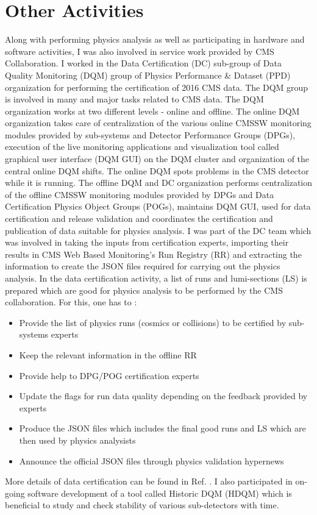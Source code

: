 \section{Other Activities}
Along with performing physics analysis as well as participating in hardware and software activities, I was also involved in service work provided by CMS Collaboration. I worked in the Data Certification (DC) sub-group of Data Quality Monitoring (DQM) group \cite{DQM} of Physics Performance \& Dataset (PPD) organization for performing the certification of 2016 CMS data. The DQM group is involved in many and major tasks related to CMS data. The DQM organization works at two different levels - online and offline. The online DQM organization takes care of centralization of the various online CMSSW monitoring modules provided by sub-systems and  Detector Performance Groups (DPGs), execution of the live monitoring applications and visualization tool called graphical user interface (DQM GUI) on the DQM cluster and organization of the central online DQM shifts. The online DQM spots problems in the CMS detector while it is running. The offline DQM and DC organization performs centralization of the offline CMSSW monitoring modules provided by DPGs and Data Certification Physics Object Groups (POGs), maintains DQM GUI, used for data certification and release validation and coordinates the certification and publication of data suitable for physics analysis. I was part of the DC team which was involved in taking the inputs from certification experts, importing their results in CMS Web Based Monitoring's Run Registry (RR) and extracting the information to create the JSON files required for carrying out the physics analysis. In the data certification activity, a list of runs and lumi-sections (LS) is prepared which are good for physics analysis to be performed by the CMS collaboration. For this, one has to :

\begin{itemize}
\item Provide the list of physics runs (cosmics or collisions) to be certified by sub-systems experts
\item Keep the relevant information in the offline RR
\item Provide help to DPG/POG certification experts
\item Update the flags for run data quality depending on the feedback provided by experts
\item Produce the JSON files which includes the final good runs and LS which are then used by physics analysists
\item Announce the official JSON files through physics validation hypernews 
\end{itemize}

More details of data certification can be found in Ref. \cite{DC}. I also participated in on-going software development of a tool called Historic DQM (HDQM) which is beneficial to study and check stability of various sub-detectors with time.

